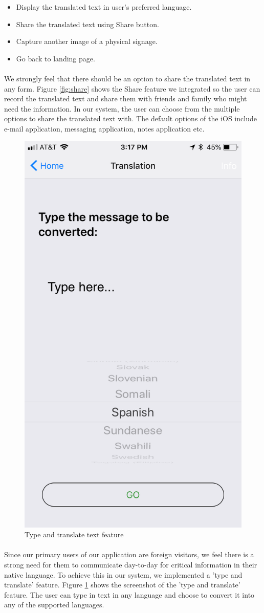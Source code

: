 \documentclass[12pt]{article}
\begin{document}
\begin{itemize}
	\item Display the translated text in user's preferred language.
	\item Share the translated text using Share button.
	\item Capture another image of a physical signage.
	\item Go back to landing page.
\end{itemize}

\paragraph{}We strongly feel that there should be an option to share the translated text in any form. Figure \ref{fig:share} shows the Share feature we integrated so the user can record the translated text and share them with friends and family who might need the information. In our system, the user can choose from the multiple options to share the translated text with. The default options of the iOS include e-mail application, messaging application, notes application etc. 

\begin{figure}[H]
	\centering
	\includegraphics[width=0.5\linewidth]{media/5.PNG}
	\caption{Type and translate text feature}
	\label{fig:type}
\end{figure} 

\paragraph{} Since our primary users of our application are foreign visitors, we feel there is a strong need for them to communicate day-to-day for critical information in their native language. To achieve this in our system, we implemented a 'type and translate' feature. Figure \ref{fig:type} shows the screenshot of the 'type and translate' feature. The user can type in text in any language and choose to convert it into any of the supported languages. 
\end{document}
